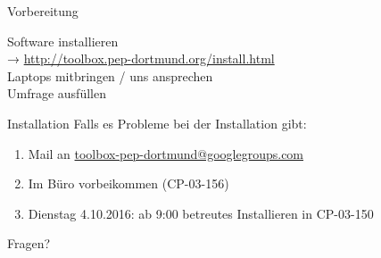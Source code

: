 \begin{frame}{Vorbereitung}
  \begin{center}
    \huge
    Software installieren\\[0.5\baselineskip]
    → \textcolor{blue!70!black}{\url{http://toolbox.pep-dortmund.org/install.html}}\\[0.5\baselineskip]
    Laptops mitbringen / uns ansprechen\\[0.5\baselineskip]
    Umfrage ausfüllen
  \end{center}
\end{frame}
\begin{frame}{Installation}
  \huge
  Falls es Probleme bei der Installation gibt:\\[0.5\baselineskip]
  \begin{enumerate}
    \item Mail an \href{mailto:toolbox-pep-dortmund@googlegroups.com}{toolbox-pep-dortmund@googlegroups.com}
    \item Im Büro vorbeikommen (CP-03-156)
    \item Dienstag 4.10.2016: ab 9:00 betreutes Installieren in CP-03-150
  \end{enumerate}
\end{frame}
\begin{frame}
  \Huge\centering
  \textcolor{red!70!black}{Fragen?}
\end{frame}

